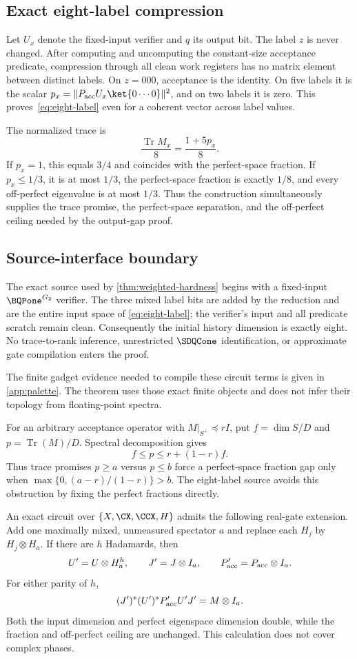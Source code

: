 \subsection{Exact eight-label compression}

Let \(U_x\) denote the fixed-input verifier and \(q\) its output bit. The label \(z\) is never changed. After computing and uncomputing the constant-size acceptance predicate, compression through all clean work registers has no matrix element between distinct labels. On \(z=000\), acceptance is the identity. On five labels it is the scalar
\(
p_x=\|P_{\rm acc}U_x\ket{0\cdots0}\|^2
\),
and on two labels it is zero. This proves~\cref{eq:eight-label} even for a coherent vector across label values.

The normalized trace is
\[
\frac{\operatorname{Tr}M_x}{8}
=\frac{1+5p_x}{8}.
\]
If \(p_x=1\), this equals \(3/4\) and coincides with the perfect-space fraction. If \(p_x\le1/3\), it is at most \(1/3\), the perfect-space fraction is exactly \(1/8\), and every off-perfect eigenvalue is at most \(1/3\). Thus the construction simultaneously supplies the trace promise, the perfect-space separation, and the off-perfect ceiling needed by the output-gap proof.

\subsection{Source-interface boundary}
\label{app:source-boundaries}

The exact source used by \cref{thm:weighted-hardness} begins with a
fixed-input \(\BQPone^{G_2}\) verifier.  The three mixed label bits are added
by the reduction and are the entire input space of
\cref{eq:eight-label}; the verifier's input and all predicate scratch remain
clean.  Consequently the initial history dimension is exactly eight.  No
trace-to-rank inference, unrestricted \(\SDQCone\) identification, or
approximate gate compilation enters the proof.

The finite gadget evidence needed to compile these circuit terms is given in
\cref{app:palette}.  The theorem uses those exact finite objects and does not
infer their topology from floating-point spectra.

For an arbitrary acceptance operator with
\(M|_{S^\perp}\preceq rI\), put \(f=\dim S/D\) and
\(p=\operatorname{Tr}(M)/D\).  Spectral decomposition gives
\[
f\le p\le r+(1-r)f.
\]
Thus trace promises \(p\ge a\) versus \(p\le b\) force a perfect-space
fraction gap only when
\(\max\{0,(a-r)/(1-r)\}>b\).  The eight-label source avoids this obstruction
by fixing the perfect fractions directly.

An exact circuit over \(\{X,\CX,\CCX,H\}\) admits the following real-gate
extension.  Add one maximally mixed, unmeasured spectator \(a\) and replace
each \(H_j\) by \(H_j\otimes H_a\).  If there are \(h\) Hadamards, then
\[
U'=U\otimes H_a^h,\qquad J'=J\otimes I_a,\qquad
P'_{\rm acc}=P_{\rm acc}\otimes I_a.
\]
For either parity of \(h\),
\[
(J')^*(U')^*P'_{\rm acc}U'J'=M\otimes I_a.
\]
Both the input dimension and perfect eigenspace dimension double, while the
fraction and off-perfect ceiling are unchanged.  This calculation does not
cover complex phases.
